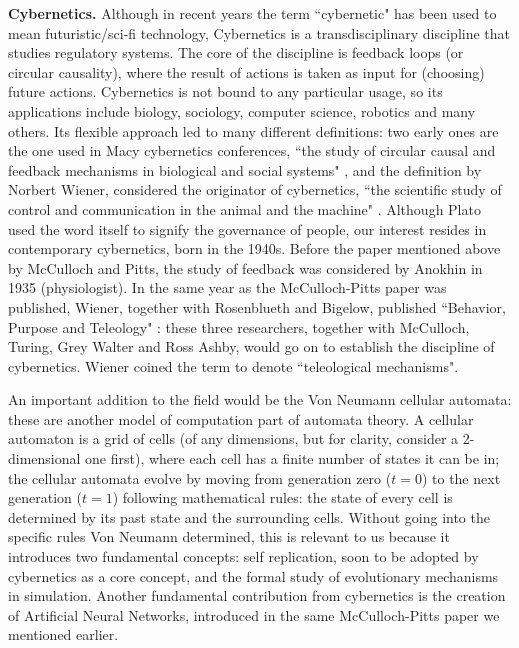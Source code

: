 \documentclass[../main.tex]{subfiles}
\begin{document}
\vspace{4pt}
\textbf{Cybernetics.}
Although in recent years the term ``cybernetic" has been used to mean futuristic/sci-fi technology, Cybernetics is a transdisciplinary discipline that studies regulatory systems. The core of the discipline is feedback loops (or circular causality), where the result of actions is taken as input for (choosing) future actions. Cybernetics is not bound to any particular usage, so its applications include biology, sociology, computer science, robotics and many others. Its flexible approach led to many different definitions: two early ones are the one used in Macy cybernetics conferences, ``the study of circular causal and feedback mechanisms in biological and social systems" \parencite{steerCyberneticsCircularCausal1952}, and the definition by Norbert Wiener, considered the originator of cybernetics, ``the scientific study of control and communication in the animal and the machine" \parencite{wienerCyberneticsControlCommunication1961}. Although Plato used the word itself to signify the governance of people, our interest resides in contemporary cybernetics, born in the 1940s. Before the paper mentioned above by McCulloch and Pitts, the study of feedback was considered by Anokhin in 1935  \parencite{anokhinProblemsCentrePeriphery1935} (physiologist). In the same year as the McCulloch-Pitts paper was published, Wiener, together with Rosenblueth and Bigelow, published ``Behavior, Purpose and Teleology"  \parencite{rosenbluethBehaviorPurposeTeleology1943}: these three researchers, together with McCulloch, Turing, Grey Walter and Ross Ashby, would go on to establish the discipline of cybernetics. Wiener coined the term to denote ``teleological mechanisms".

An important addition to the field would be the Von Neumann cellular automata: these are another model of computation part of automata theory. A cellular automaton is a grid of cells (of any dimensions, but for clarity, consider a 2-dimensional one first), where each cell has a finite number of states it can be in; the cellular automata evolve by moving from generation zero ($t=0$) to the next generation ($t=1$) following mathematical rules: the state of every cell is determined by its past state and the surrounding cells. Without going into the specific rules Von Neumann determined, this is relevant to us because it introduces two fundamental concepts: self replication, soon to be adopted by cybernetics as a core concept, and the formal study of evolutionary mechanisms in simulation. Another fundamental contribution from cybernetics is the creation of Artificial Neural Networks, introduced in the same McCulloch-Pitts paper we mentioned earlier.
\end{document}
